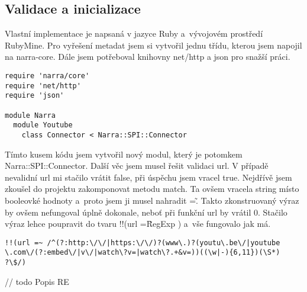 \subsection{Validace a inicializace}
\par Vlastní implementace je napsaná v jazyce Ruby a~vývojovém prostředí RubyMine. Pro vyřešení metadat jsem si vytvořil jednu třídu, kterou jsem napojil na narra-core. Dále jsem potřeboval knihovny net/http a json pro snažší práci.
\begin{verbatim}
require 'narra/core'
require 'net/http'
require 'json'

module Narra
  module Youtube
    class Connector < Narra::SPI::Connector
\end{verbatim}
\par Tímto kusem kódu jsem vytvořil nový modul, který je potomkem Narra::\-SPI::Connector. Další věc jsem musel řešit validaci url. V případě nevalidní url mi stačilo vrátit false, při úspěchu jsem vracel true. Nejdřívě jsem zkoušel do projektu zakomponovat metodu match. Ta ovšem vracela string místo booleovké hodnoty a~proto jsem ji musel nahradit =\~. Takto zkonstruovaný výraz by ovšem nefungoval úplně dokonale, neboť při funkční url by vrátil 0. Stačilo výraz lehce poupravit do tvaru !!(url =\~ RegExp ) a~vše fungovalo jak má.
\begin{verbatim}
!!(url =~ /^(?:http:\/\/|https:\/\/)?(www\.)?(youtu\.be\/|youtube
\.com\/(?:embed\/|v\/|watch\?v=|watch\?.+&v=))((\w|-){6,11})(\S*)
?\$/)
\end{verbatim}

\par // todo Popis RE

